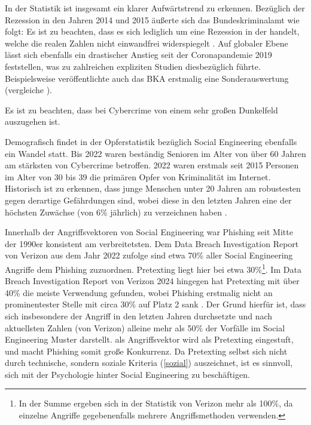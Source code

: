 In der Statistik ist insgesamt ein klarer Aufwärtstrend zu erkennen. Bezüglich der Rezession in den Jahren 2014 und 2015 äußerte sich das Bundeskriminalamt wie folgt:
 Es ist zu beachten, dass es sich lediglich um eine Rezession in der  handelt, welche die realen Zahlen nicht einwandfrei widerspiegelt .
Auf globaler Ebene lässt sich ebenfalls ein drastischer Anstieg seit der Coronapandemie 2019 feststellen, was zu zahlreichen expliziten Studien diesbezüglich führte. Beispielsweise veröffentlichte auch das BKA erstmalig eine Sonderauswertung (vergleiche ).

Es ist zu beachten, dass bei Cybercrime von einem sehr großen Dunkelfeld auszugehen ist. 

Demografisch findet in der Opferstatistik bezüglich Social Engineering ebenfalls ein Wandel statt.
Bis 2022 waren beständig Senioren im Alter von über 60 Jahren am stärksten von Cybercrime betroffen.
2022 waren erstmals seit 2015 Personen im Alter von 30 bis 39 die primären Opfer von Kriminalität im Internet.
Historisch ist zu erkennen, dass junge Menschen unter 20 Jahren am robustesten gegen derartige Gefährdungen sind, wobei diese in den letzten Jahren eine der höchsten Zuwächse (von 6\% jährlich) zu verzeichnen haben . 

Innerhalb der Angriffsvektoren von Social Engineering war Phishing seit Mitte der 1990er konsistent am verbreitetsten.
Dem Data Breach Investigation Report von Verizon aus dem Jahr 2022 zufolge sind etwa 70\% aller Social Engineering Angriffe dem Phishing zuzuordnen.
Pretexting liegt hier bei etwa 30\%\footnote{In der Summe ergeben sich in der Statistik von Verizon mehr als 100\%, da einzelne Angriffe gegebenenfalls mehrere Angriffsmethoden verwenden.}.
Im Data Breach Investigation Report von Verizon 2024 hingegen hat Pretexting mit über 40\% die meiste Verwendung gefunden, wobei Phishing erstmalig nicht an prominentester Stelle mit circa 30\% auf Platz 2 sank .
Der Grund hierfür ist, dass sich insbesondere der  Angriff in den letzten Jahren durchsetzte und nach aktuellsten Zahlen (von Verizon) alleine mehr als 50\% der Vorfälle im Social Engineering Muster darstellt.
 als Angriffsvektor wird als Pretexting eingestuft, und macht Phishing somit große Konkurrenz. Da Pretexting selbst sich nicht durch technische, sondern soziale Kriteria (\autoref{sozial}) auszeichnet, ist es sinnvoll, sich mit der Psychologie hinter Social Engineering zu beschäftigen.

